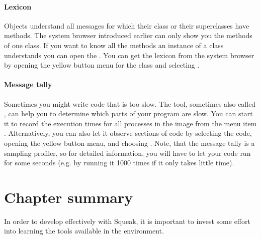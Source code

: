 \documentclass[a4paper,10pt,twoside]{book}
\begin{document}
\paragraph{Lexicon}
Objects understand all messages for which their class or their superclasses have methods.
The system browser introduced earlier can only show you the methods of one class.
If you want to know all the methods an instance of a class understands you can open the .
You can get the lexicon from the system browser by opening the yellow button menu for the class and selecting .

\paragraph{Message tally}
Sometimes you might write code that is too slow.
The  tool, sometimes also called , can help you to determine which parts of your program are slow.
You can start it to record the execution times for all processes in the image from the menu item .
Alternatively, you can also let it observe sections of code by selecting the code, opening the yellow button menu, and choosing .
Note, that the message tally is a sampling profiler, so for detailed information, you will have to let your code run for some seconds (e.g. by running it 1000 times if it only takes little time).

\section{Chapter summary}

In order to develop effectively with Squeak, it is important to invest some effort into learning the tools available in the environment.
\end{document}
